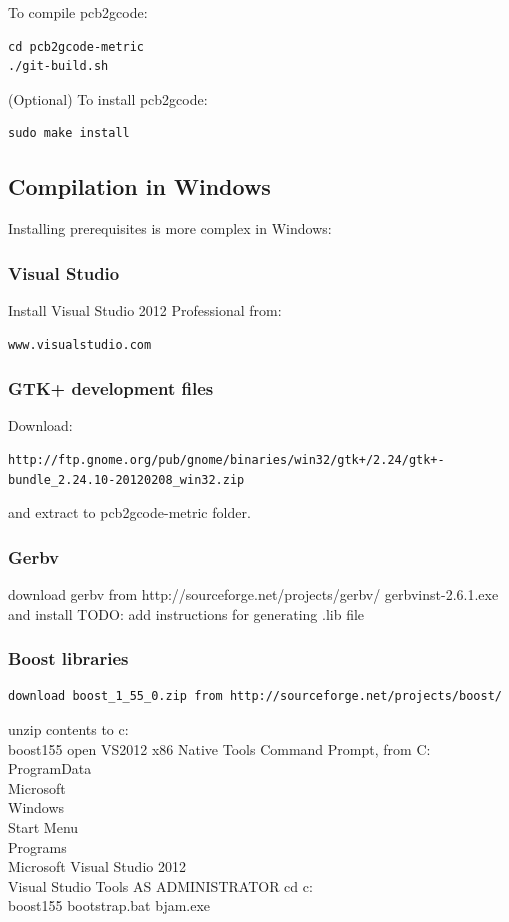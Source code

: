 \documentclass[a4paper,11pt]{article}  %
\begin{document}
To compile pcb2gcode:
\begin{lstlisting}[frame=single]
cd pcb2gcode-metric
./git-build.sh
\end{lstlisting}

(Optional) To install pcb2gcode:
\begin{lstlisting}[frame=single]
sudo make install
\end{lstlisting}

\subsection{Compilation in Windows}
Installing prerequisites is more complex in Windows:

\subsubsection{Visual Studio}
Install Visual Studio 2012 Professional from:
\begin{lstlisting}[frame=single]
www.visualstudio.com
\end{lstlisting}

\subsubsection{GTK+ development files}
Download:
\begin{lstlisting}[frame=single,breaklines=true]
http://ftp.gnome.org/pub/gnome/binaries/win32/gtk+/2.24/gtk+-bundle_2.24.10-20120208_win32.zip
\end{lstlisting}
and extract to pcb2gcode-metric folder.

\subsubsection{Gerbv}
download gerbv from http://sourceforge.net/projects/gerbv/
gerbvinst-2.6.1.exe and install
TODO: add instructions for generating .lib file

\subsubsection{Boost libraries}
\begin{lstlisting}[frame=single,breaklines=true]
download boost_1_55_0.zip from http://sourceforge.net/projects/boost/
\end{lstlisting}
unzip contents to c:\\boost155
open VS2012 x86 Native Tools Command Prompt, from C:\\ProgramData\\Microsoft\\Windows\\Start Menu\\Programs\\Microsoft Visual Studio 2012\\Visual Studio Tools
AS ADMINISTRATOR
cd c:\\boost155
bootstrap.bat
bjam.exe
\end{document}
